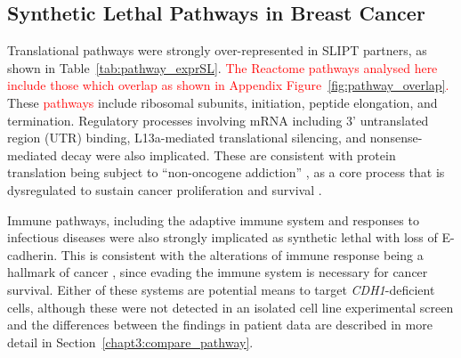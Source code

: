 
\subsection{Synthetic Lethal Pathways in Breast Cancer} \label{chapt3:exprSL_pathways}

Translational \glspl{pathway} were strongly over-represented in \gls{SLIPT} partners, as shown in Table~\ref{tab:pathway_exprSL}. \textcolor{red}{The Reactome pathways analysed here include those which overlap as shown in Appendix Figure~\ref{fig:pathway_overlap}.} These \textcolor{red}{pathways} include ribosomal subunits, initiation, peptide elongation, and termination. Regulatory processes involving \acrshort{mRNA} including 3' untranslated region (UTR) binding, L13a-mediated translational silencing, and nonsense-mediated decay were also implicated. These are consistent with protein translation being subject to ``\gls{non-oncogene addiction}'' \citep{Luo2009}, as a core process that is dysregulated to sustain cancer proliferation and survival \citep{Gao2015}.

Immune \glspl{pathway}, including the adaptive immune system and responses to infectious diseases were also strongly implicated as \gls{synthetic lethal} with loss of \gls{E-cadherin}. This is consistent with the alterations of immune response being a hallmark of cancer \cite{Hanahan2000}, since evading the immune system is necessary for cancer survival. Either of these systems are potential means to target \textit{CDH1}-deficient cells, although these were not detected in an isolated cell line experimental screen \citep{Telford2015} and the differences between the findings in patient data are described in more detail in Section~\ref{chapt3:compare_pathway}.

